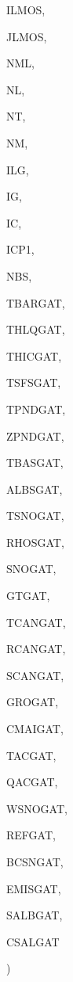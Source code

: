 {\begin{DoxyParamCaption}
\item[{integer, dimension (ilg)}]{I\+L\+M\+O\+S, }
\item[{integer, dimension  (ilg)}]{J\+L\+M\+O\+S, }
\item[{integer}]{N\+M\+L, }
\item[{integer}]{N\+L, }
\item[{integer}]{N\+T, }
\item[{integer}]{N\+M, }
\item[{integer}]{I\+L\+G, }
\item[{integer}]{I\+G, }
\item[{integer}]{I\+C, }
\item[{integer}]{I\+C\+P1, }
\item[{integer}]{N\+B\+S, }
\item[{real, dimension(ilg,ig)}]{T\+B\+A\+R\+G\+A\+T, }
\item[{real, dimension(ilg,ig)}]{T\+H\+L\+Q\+G\+A\+T, }
\item[{real, dimension(ilg,ig)}]{T\+H\+I\+C\+G\+A\+T, }
\item[{real, dimension(ilg,4)}]{T\+S\+F\+S\+G\+A\+T, }
\item[{real, dimension(ilg)}]{T\+P\+N\+D\+G\+A\+T, }
\item[{real, dimension(ilg)}]{Z\+P\+N\+D\+G\+A\+T, }
\item[{real, dimension(ilg)}]{T\+B\+A\+S\+G\+A\+T, }
\item[{real, dimension(ilg)}]{A\+L\+B\+S\+G\+A\+T, }
\item[{real, dimension(ilg)}]{T\+S\+N\+O\+G\+A\+T, }
\item[{real, dimension(ilg)}]{R\+H\+O\+S\+G\+A\+T, }
\item[{real, dimension (ilg)}]{S\+N\+O\+G\+A\+T, }
\item[{real, dimension  (ilg)}]{G\+T\+G\+A\+T, }
\item[{real, dimension(ilg)}]{T\+C\+A\+N\+G\+A\+T, }
\item[{real, dimension(ilg)}]{R\+C\+A\+N\+G\+A\+T, }
\item[{real, dimension(ilg)}]{S\+C\+A\+N\+G\+A\+T, }
\item[{real, dimension (ilg)}]{G\+R\+O\+G\+A\+T, }
\item[{real, dimension(ilg)}]{C\+M\+A\+I\+G\+A\+T, }
\item[{real, dimension (ilg)}]{T\+A\+C\+G\+A\+T, }
\item[{real, dimension (ilg)}]{Q\+A\+C\+G\+A\+T, }
\item[{real, dimension(ilg)}]{W\+S\+N\+O\+G\+A\+T, }
\item[{real, dimension (ilg)}]{R\+E\+F\+G\+A\+T, }
\item[{real, dimension(ilg)}]{B\+C\+S\+N\+G\+A\+T, }
\item[{real, dimension(ilg)}]{E\+M\+I\+S\+G\+A\+T, }
\item[{real, dimension(ilg,nbs)}]{S\+A\+L\+B\+G\+A\+T, }
\item[{real, dimension(ilg,nbs)}]{C\+S\+A\+L\+G\+A\+T}
\end{DoxyParamCaption}
)}\label{CLASSS_8f_a3814fc276d21467a86f856186dd5d938}

